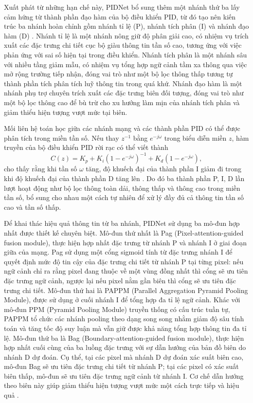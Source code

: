 Xuất phát từ những hạn chế này, PIDNet bổ sung thêm một nhánh thứ ba lấy cảm hứng từ thành phần đạo hàm của bộ điều khiển PID, từ đó tạo nên kiến trúc ba nhánh hoàn chỉnh gồm nhánh tỉ lệ (P), nhánh tích phân (I) và nhánh đạo hàm (D) \cite{PID}. Nhánh tỉ lệ là một nhánh nông giữ độ phân giải cao, có nhiệm vụ trích xuất các đặc trưng chi tiết cục bộ giàu thông tin tần số cao, tương ứng với việc phản ứng với sai số hiện tại trong điều khiển. Nhánh tích phân là một nhánh sâu với nhiều tầng giảm mẫu, có nhiệm vụ tổng hợp ngữ cảnh tầm xa thông qua việc mở rộng trường tiếp nhận, đóng vai trò như một bộ lọc thông thấp tương tự thành phần tích phân tích luỹ thông tin trong quá khứ. Nhánh đạo hàm là một nhánh phụ trợ chuyên trích xuất các đặc trưng biên đối tượng, đóng vai trò như một bộ lọc thông cao để bù trừ cho xu hướng làm mịn của nhánh tích phân và giảm thiểu hiện tượng vượt mức tại biên.

Mối liên hệ toán học giữa các nhánh mạng và các thành phần PID có thể được phân tích trong miền tần số. Nếu thay $z^{-1}$ bằng $e^{-j\omega}$ trong biểu diễn miền $z$, hàm truyền của bộ điều khiển PID rời rạc có thể viết thành
\begin{equation}
  C(z) = K_p + K_i\left(1 - e^{-j\omega}\right)^{-1} + K_d\left(1 - e^{-j\omega}\right),
\end{equation}
cho thấy rằng khi tần số $\omega$ tăng, độ khuếch đại của thành phần I giảm đi trong khi độ khuếch đại của thành phần D tăng lên \cite{PID}. Do đó ba thành phần P, I, D lần lượt hoạt động như bộ lọc thông toàn dải, thông thấp và thông cao trong miền tần số, bổ sung cho nhau một cách tự nhiên để xử lý đầy đủ cả thông tin tần số cao và tần số thấp.

Để khai thác hiệu quả thông tin từ ba nhánh, PIDNet sử dụng ba mô-đun hợp nhất được thiết kế chuyên biệt. Mô-đun thứ nhất là Pag (Pixel-attention-guided fusion module), thực hiện hợp nhất đặc trưng từ nhánh P và nhánh I ở giai đoạn giữa của mạng. Pag sử dụng một cổng sigmoid tính từ đặc trưng nhánh I để quyết định mức độ tin cậy của đặc trưng chi tiết từ nhánh P tại từng pixel: nếu ngữ cảnh chỉ ra rằng pixel đang thuộc về một vùng đồng nhất thì cổng sẽ ưu tiên đặc trưng ngữ cảnh, ngược lại nếu pixel nằm gần biên thì cổng sẽ ưu tiên đặc trưng chi tiết. Mô-đun thứ hai là PAPPM (Parallel Aggregation Pyramid Pooling Module), được sử dụng ở cuối nhánh I để tổng hợp đa tỉ lệ ngữ cảnh. Khác với mô-đun PPM (Pyramid Pooling Module) truyền thống có cấu trúc tuần tự, PAPPM tổ chức các nhánh pooling theo dạng song song nhằm giảm độ sâu tính toán và tăng tốc độ suy luận mà vẫn giữ được khả năng tổng hợp thông tin đa tỉ lệ. Mô-đun thứ ba là Bag (Boundary-attention-guided fusion module), thực hiện hợp nhất cuối cùng của ba luồng đặc trưng với sự dẫn hướng của bản đồ biên do nhánh D dự đoán. Cụ thể, tại các pixel mà nhánh D dự đoán xác suất biên cao, mô-đun Bag sẽ ưu tiên đặc trưng chi tiết từ nhánh P; tại các pixel có xác suất biên thấp, mô-đun sẽ ưu tiên đặc trưng ngữ cảnh từ nhánh I. Cơ chế dẫn hướng theo biên này giúp giảm thiểu hiện tượng vượt mức một cách trực tiếp và hiệu quả \cite{PID}.

